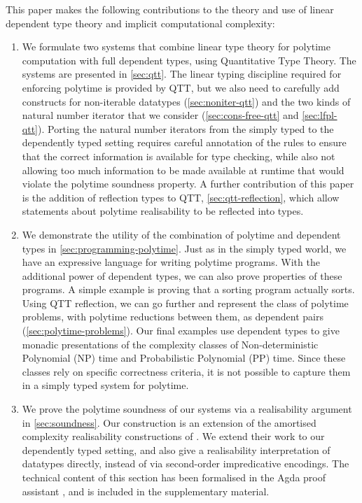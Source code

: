 \documentclass[acmsmall,screen]{acmart}
\begin{document}
This paper makes the following contributions to the theory and use of
linear dependent type theory and implicit computational complexity:
\begin{enumerate}
\item We formulate two systems that combine linear type theory for
  polytime computation with full dependent types, using Quantitative
  Type Theory. The systems are presented in \autoref{sec:qtt}. The
  linear typing discipline required for enforcing polytime is provided
  by QTT, but we also need to carefully add constructs for
  non-iterable datatypes (\autoref{sec:noniter-qtt}) and the two kinds
  of natural number iterator that we consider
  (\autoref{sec:cons-free-qtt} and \autoref{sec:lfpl-qtt}). Porting
  the natural number iterators from the simply typed to the
  dependently typed setting requires careful annotation of the rules
  to ensure that the correct information is available for type
  checking, while also not allowing too much information to be made
  available at runtime that would violate the polytime soundness
  property. A further contribution of this paper is the addition of
  reflection types to QTT, \autoref{sec:qtt-reflection}, which allow
  statements about polytime realisability to be reflected into
  types.
\item We demonstrate the utility of the combination of polytime and
  dependent types in \autoref{sec:programming-polytime}. Just as in
  the simply typed world, we have an expressive language for writing
  polytime programs. With the additional power of dependent types, we
  can also prove properties of these programs. A simple example is
  proving that a sorting program actually sorts. Using QTT reflection,
  we can go further and represent the class of polytime problems, with
  polytime reductions between them, as dependent pairs
  (\autoref{sec:polytime-problems}). Our final examples use dependent
  types to give monadic presentations of the complexity classes of
  Non-deterministic Polynomial (NP) time and Probabilistic Polynomial
  (PP) time. Since these classes rely on specific correctness
  criteria, it is not possible to capture them in a simply typed
  system for polytime.
\item We prove the polytime soundness of our systems via a
  realisability argument in \autoref{sec:soundness}. Our construction
  is an extension of the amortised complexity realisability
  constructions of \citet{dallago11realisability}. We extend their
  work to our dependently typed setting, and also give a realisability
  interpretation of datatypes directly, instead of via second-order
  impredicative encodings. The technical content of this section has
  been formalised in the Agda proof assistant
  \cite{norell2008dependently}, and is included in the supplementary
  material.
\end{enumerate}
\end{document}
